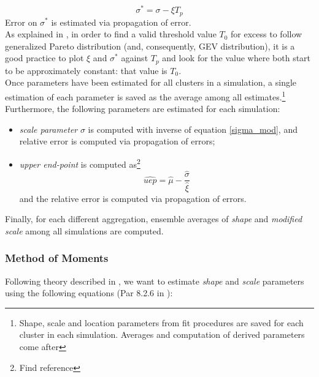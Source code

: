 \documentclass{article}
\begin{document}
\begin{equation} \label{sigma_mod}
\sigma^*=\sigma-\xi T_p
\end{equation}
Error on $\sigma^*$ is estimated via propagation of error.\\
As explained in \cite{Coles}, in order to find a valid threshold value $T_0$ for excess to follow generalized Pareto distribution (and, consequently, GEV distribution), it is a good practice to plot $\xi$ and $\sigma^*$ against $T_p$ and look for the value where both start to be approximately constant: that value is $T_0$.\\
Once parameters have been estimated for all clusters in a simulation, a single estimation of each parameter is saved as the average among all estimates.\footnote{Shape, scale and location parameters from fit procedures are saved for each cluster in each simulation. Averages and computation of derived parameters come after}
Furthermore, the following parameters are estimated for each simulation:

\begin{itemize}
	\item \textit{scale parameter} $\sigma$ is computed with inverse of equation \ref{sigma_mod}, and relative error is computed via propagation of errors; 
	\item \textit{upper end-point} is computed as\footnote{Find reference}
	\begin{equation}
	\hat{uep}=\hat{\mu}-\frac{\hat{\sigma}}{\hat{\xi}}
	\end{equation}
	and the relative error is computed via propagation of errors.
	
\end{itemize}
Finally, for each different aggregation, ensemble averages of \textit{shape} and \textit{modified scale} among all simulations are computed.

\subsubsection{Method of Moments} \label{subsubsection_mom}

Following theory described in \cite{LucariniExtremesBook}, we want to estimate \textit{shape} and \textit{scale} parameters using the following equations (Par 8.2.6 in \cite{LucariniExtremesBook}):
\end{document}
